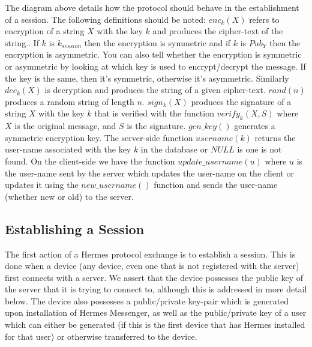 \documentclass{article}
\begin{document}
The diagram above details how the protocol should behave in the establishment of a session. The following definitions should be noted: $enc_{k}(X)$ refers to encryption of a string $X$ with the key $k$ and produces the cipher-text of the string.. If $k$ is $k_{session}$ then the encryption is symmetric and if $k$ is $Pub_Y$ then the encryption is asymmetric. You can also tell whether the encryption is symmetric or asymmetric by looking at which key is used to encrypt/decrypt the message. If the key is the same, then it's symmetric, otherwise it's asymmetric. Similarly $dec_k(X)$ is decryption and produces the string of a given cipher-text. $rand(n)$ produces a random string of length $n$. $sign_k(X)$ produces the signature of a string $X$ with the key $k$ that is verified with the function $verify_k(X,S)$ where $X$ is the original message, and $S$ is the signature. $gen\_key()$ generates a symmetric encryption key. The server-side function $username(k)$ returns the user-name associated with the key $k$ in the database or $NULL$ is one is not found. On the client-side we have the function $update\_username(u)$ where $u$ is the user-name sent by the server which updates the user-name on the client or updates it using the $new\_username()$ function and sends the user-name (whether new or old) to the server.

\subsection{Establishing a Session}

The first action of a Hermes protocol exchange is to establish a session. This is done when a device (any device, even one that is not registered with the server) first connects with a server. We assert that the device possesses the public key of the server that it is trying to connect to, although this is addressed in more detail below. The device also possesses a public/private key-pair which is generated upon installation of Hermes Messenger, as well as the public/private key of a user which can either be generated (if this is the first device that has Hermes installed for that user) or otherwise transferred to the device.
\end{document}
